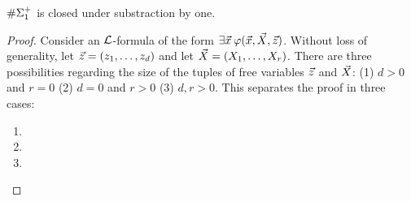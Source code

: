 \begin{theo}
$\E1$ is closed under substraction by one.
\end{theo}
\begin{proof}
Consider an ${\cal L}$-formula of the form $\exists\vec{x}\:\varphi(\vec{x},\vec{X},\vec{z})$. Without loss of generality, let $\vec{z} = (z_1,\dots,z_d)$ and let $\vec{X} = (X_1,\dots,X_r)$. There are three possibilities regarding the size of the tuples of free variables $\vec{z}$ and $\vec{X}$: (1) $d>0$ and $r=0$ (2) $d=0$ and $r>0$ (3) $d,r>0$. This separates the proof in three cases:
\begin{enumerate}
\item 

\item 




\item 
\end{enumerate}
\end{proof}